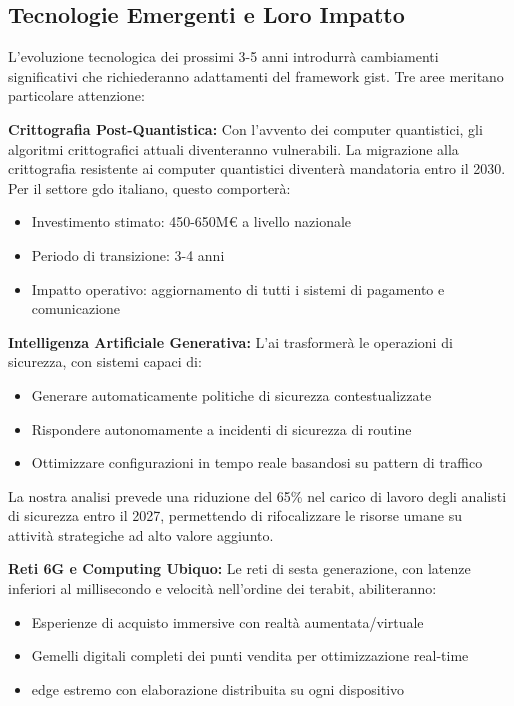 \subsection{\texorpdfstring{Tecnologie Emergenti e Loro Impatto}{5.5.1 - Tecnologie Emergenti e Loro Impatto}}
\label{subsec:5.5.1}

L'evoluzione tecnologica dei prossimi 3-5 anni introdurrà cambiamenti significativi che richiederanno adattamenti del framework \gls{gist}. Tre aree meritano particolare attenzione:

\textbf{Crittografia Post-Quantistica:} Con l'avvento dei computer quantistici, gli algoritmi crittografici attuali diventeranno vulnerabili. La migrazione alla crittografia resistente ai computer quantistici diventerà mandatoria entro il 2030. Per il settore \gls{gdo} italiano, questo comporterà:
\begin{itemize}
\item Investimento stimato: 450-650M€ a livello nazionale
\item Periodo di transizione: 3-4 anni
\item Impatto operativo: aggiornamento di tutti i sistemi di pagamento e comunicazione
\end{itemize}

\textbf{Intelligenza Artificiale Generativa:} L'\gls{ai} trasformerà le operazioni di sicurezza, con sistemi capaci di:
\begin{itemize}
\item Generare automaticamente politiche di sicurezza contestualizzate
\item Rispondere autonomamente a incidenti di sicurezza di routine
\item Ottimizzare configurazioni in tempo reale basandosi su pattern di traffico
\end{itemize}

La nostra analisi prevede una riduzione del 65\% nel carico di lavoro degli analisti di sicurezza entro il 2027, permettendo di rifocalizzare le risorse umane su attività strategiche ad alto valore aggiunto.

\textbf{Reti 6G e Computing Ubiquo:} Le reti di sesta generazione, con latenze inferiori al millisecondo e velocità nell'ordine dei terabit, abiliteranno:
\begin{itemize}
\item Esperienze di acquisto immersive con realtà aumentata/virtuale
\item Gemelli digitali completi dei punti vendita per ottimizzazione real-time
\item \gls{edge} estremo con elaborazione distribuita su ogni dispositivo
\end{itemize}

